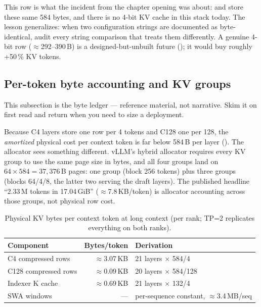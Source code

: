 \begin{hblesson}
This row is what the  incident from the chapter opening was
about:  and  store these same 584 bytes,
and there is no 4-bit KV cache in this stack today. The lesson generalizes:
when two configuration strings are documented as byte-identical, audit every
string comparison that treats them differently. A genuine 4-bit row
($\approx$292--390\,B) is a designed-but-unbuilt future
(); it would buy roughly
+50\,\% KV tokens.
\end{hblesson}

\subsection{Per-token byte accounting and KV groups}

This subsection is the byte ledger --- reference material, not narrative.
Skim it on first read and return when you need to size a deployment.

Because C4 layers store one row per 4 tokens and C128 one per 128, the
\emph{amortized} physical cost per context token is far below 584\,B per layer
(). The allocator sees something different. vLLM's hybrid
allocator requires every KV group to use the same page size in bytes, and all
four groups land on $64 \times 584 = 37{,}376$\,B pages: one
 group (block 256 tokens) plus three
 groups (blocks 64/4/8, the latter two serving the
draft layers). The published headline ``2.33\,M tokens in 17.04\,GiB''
($\approx$7.8\,KB/token) is allocator accounting across those groups, not
physical row cost.

\begin{table}[htbp]
  \centering\small
  \caption{Physical KV bytes per context token at long context (per rank;
  TP=2 replicates everything on both ranks).}
  \label{tab:kv-bytes}
  \begin{tabular}{@{}lrl@{}}
    \toprule
    Component & Bytes/token & Derivation \\
    \midrule
    C4 compressed rows & $\approx$3.07\,KB & 21 layers $\times$ 584/4 \\
    C128 compressed rows & $\approx$0.09\,KB & 20 layers $\times$ 584/128 \\
    Indexer K cache & $\approx$0.69\,KB & 21 layers $\times$ 132/4 \\
    SWA windows & --- & per-sequence constant, $\approx$3.4\,MB/seq \\
    \bottomrule
  \end{tabular}
\end{table}

